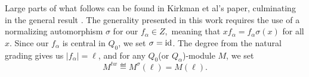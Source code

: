 \documentclass [11pt, proquest] {uwthesis}[2020/02/24]
\begin{document}
%        
    
    Large parts of what follows can be found in Kirkman et al's paper, culminating in the general result \cite{kirkman13}. The generality presented in this work requires the use of a normalizing automorphism $\sigma$ for our $f_\alpha\in Z,$ meaning that $xf_\alpha=f_\alpha\sigma(x)$ for all $x$. Since our $f_\alpha$ is central in $Q_0$, we  set $\sigma=\operatorname{id}$. The degree from the natural grading gives us $|f_\alpha|=\ell$, and for any $Q_0$(or $Q_\alpha$)-module $M$, we set
    \[M^{tw}\eqdef M^\sigma(\ell)=M(\ell).\]
    
\end{document}
